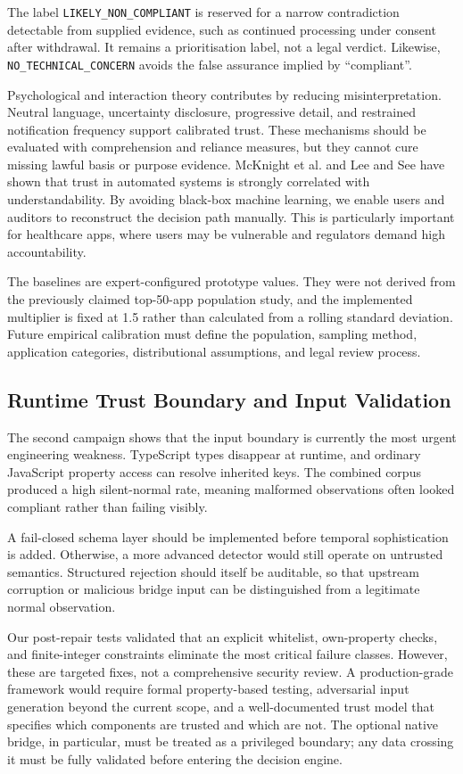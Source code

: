 The label \texttt{LIKELY\_NON\_COMPLIANT} is reserved for a narrow contradiction detectable from supplied evidence, such as continued processing under consent after withdrawal. It remains a prioritisation label, not a legal verdict. Likewise, \texttt{NO\_TECHNICAL\_CONCERN} avoids the false assurance implied by ``compliant''.

Psychological and interaction theory contributes by reducing misinterpretation. Neutral language, uncertainty disclosure, progressive detail, and restrained notification frequency support calibrated trust. These mechanisms should be evaluated with comprehension and reliance measures, but they cannot cure missing lawful basis or purpose evidence. McKnight et al. \cite{33} and Lee and See \cite{34} have shown that trust in automated systems is strongly correlated with understandability. By avoiding black‑box machine learning, we enable users and auditors to reconstruct the decision path manually. This is particularly important for healthcare apps, where users may be vulnerable and regulators demand high accountability.

The baselines are expert-configured prototype values. They were not derived from the previously claimed top-50-app population study, and the implemented multiplier is fixed at 1.5 rather than calculated from a rolling standard deviation. Future empirical calibration must define the population, sampling method, application categories, distributional assumptions, and legal review process.

\subsection{Runtime Trust Boundary and Input Validation}

The second campaign shows that the input boundary is currently the most urgent engineering weakness. TypeScript types disappear at runtime, and ordinary JavaScript property access can resolve inherited keys. The combined corpus produced a high silent-normal rate, meaning malformed observations often looked compliant rather than failing visibly.

A fail-closed schema layer should be implemented before temporal sophistication is added. Otherwise, a more advanced detector would still operate on untrusted semantics. Structured rejection should itself be auditable, so that upstream corruption or malicious bridge input can be distinguished from a legitimate normal observation.

Our post-repair tests validated that an explicit whitelist, own-property checks, and finite-integer constraints eliminate the most critical failure classes. However, these are targeted fixes, not a comprehensive security review. A production-grade framework would require formal property-based testing, adversarial input generation beyond the current scope, and a well-documented trust model that specifies which components are trusted and which are not. The optional native bridge, in particular, must be treated as a privileged boundary; any data crossing it must be fully validated before entering the decision engine.

